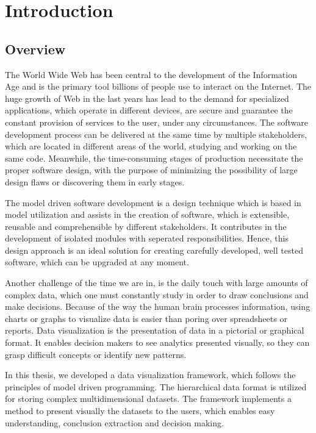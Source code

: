 
\chapter{Introduction} %

\section{Overview}
The World Wide Web has been central to the development of the Information Age and is the primary tool billions of people use to interact on the Internet. The huge growth of Web in the last years has lead to the demand for specialized applications, which operate in different devices, are secure and guarantee the constant provision of services to the user, under any circumstances. The software development process can be delivered at the same time by multiple stakeholders, which are located in different areas of the world, studying and working on the same code. Meanwhile, the time-consuming stages of production necessitate the proper software design, with the purpose of minimizing the possibility of large design flaws or discovering them in early stages. \par 
	The model driven software development is a design technique which is based in model utilization and assists in the creation of software, which is extensible, reusable and comprehensible by different stakeholders. It contributes in the development of isolated modules with seperated responsibilities. Hence, this design approach is an ideal solution for creating carefully developed, well tested software, which can be upgraded at any moment. \par 
	Another challenge of the time we are in, is the daily touch with large amounts of complex data, which one must constantly study in order to draw conclusions and make decisions. Because of the way the human brain processes information, using charts or graphs to visualize data is easier than poring over spreadsheets or reports. Data visualization is the presentation of data in a pictorial or graphical format. It enables decision makers to see analytics presented visually, so they can grasp difficult concepts or identify new patterns. \par
	In this thesis, we developed a data visualization framework, which follows the principles of model driven programming. The hierarchical data format is utilized for storing complex multidimensional datasets. The framework implements a method to present visually the datasets to the users, which enables easy understanding, conclusion extraction and decision making. \par 
